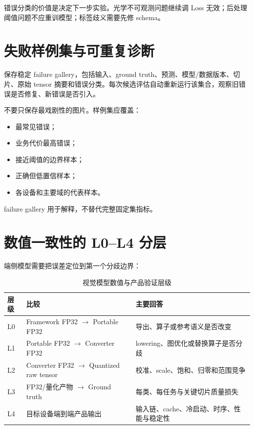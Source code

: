 错误分类的价值是决定下一步实验。光学不可观测问题继续调 Loss 无效；后处理阈值问题不应重训模型；标签歧义需要先修 schema。

\section{失败样例集与可重复诊断}

保存稳定 failure gallery，包括输入、ground truth、预测、模型/数据版本、切片、原始 tensor 摘要和错误分类。每次候选评估自动重新运行该集合，观察旧错误是否修复、新错误是否引入。

不要只保存最戏剧性的图片。样例集应覆盖：

\begin{itemize}
  \item 最常见错误；
  \item 业务代价最高错误；
  \item 接近阈值的边界样本；
  \item 正确但低置信样本；
  \item 各设备和主要域的代表样本。
\end{itemize}

failure gallery 用于解释，不替代完整固定集指标。

\section{数值一致性的 L0--L4 分层}

端侧模型需要把误差定位到第一个分歧边界：

\begin{table}[H]
  \centering
  \caption{视觉模型数值与产品验证层级}
  \begin{tabular}{p{15mm}p{47mm}p{67mm}}
    \hline
    层级 & 比较 & 主要回答 \\
    \hline
    L0 & Framework FP32 $\rightarrow$ Portable FP32 & 导出、算子或参考语义是否改变 \\
    L1 & Portable FP32 $\rightarrow$ Converter FP32 & lowering、图优化或替换算子是否分歧 \\
    L2 & Converter FP32 $\rightarrow$ Quantized raw tensor & 校准、scale、饱和、归零和范围竞争 \\
    L3 & FP32/量化产物 $\rightarrow$ Ground truth & 每类、每任务与关键切片质量损失 \\
    L4 & 目标设备端到端产品输出 & 输入链、cache、冷启动、时序、性能与稳定性 \\
    \hline
  \end{tabular}
\end{table}

